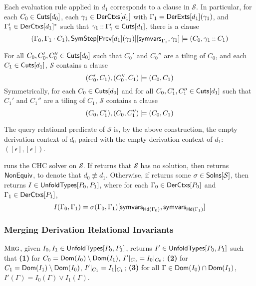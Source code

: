 Each evaluation rule applied in $d_1$ corresponds to a clause in
$\mathcal{S}$.
%
In particular, for each $C_0 \in \mathsf{Cuts}[  d_0  ]$, %
each $\gamma_1 \in \mathsf{DerCtxs}[  d_1  ]$ with $\Gamma_1 = \mathsf{DerExts}[ d_1 ](
\gamma_1 )$, and %
$\Gamma_1' \in \mathsf{DerCtxs}[  d_1  ]^{*}$ such that $\gamma_1 \mathbin{::}
\Gamma_1' \in \mathsf{Cuts}[  d_1  ]$, there is a clause
\[ ( \Gamma_0, \Gamma_1 \concat C_1), %
\symstep{ \prevrule{ d_1 }( \gamma_1 ) }[ %
\symvars{ \Gamma_1 }, \gamma_1 ] \entails %
(C_0, \gamma_1 \cons C_1) 
\]

For all $C_0, C_0', C_0'' \in \mathsf{Cuts}[ d_0 ]$ such that $C_0'$ and $C_0''$
are a tiling of $C_0$, and %
each $C_1 \in \mathsf{Cuts}[ d_1 ]$, $\mathcal{S}$ contains a clause
\[ (C_0', C_1), (C_0'', C_1) \models (C_0, C_1) \]
%
Symmetrically, for each $C_0 \in \mathsf{Cuts}[ d_0 ]$ and %
for all $C_0, C_1', C_1'' \in \mathsf{Cuts}[ d_1 ]$ such that $C_1'$ and $C_1''$
are a tiling of $C_1$, %
$\mathcal{S}$ contains a clause
\[ (C_0, C_1'), (C_0, C_1'') \models (C_0, C_1)
\]

The query relational predicate of $\mathcal{S}$ is, by the above
construction, the empty derivation context of $d_0$ paired with the
empty derivation context of $d_1$: $( [ \epsilon ], [ \epsilon ])$.

\verifyunfoldings runs the CHC solver \solvechc on $\mathcal{S}$.
%
If \solvechc returns that $\mathcal{S}$ has no solution, then
\verifyunfoldings returns $\mathsf{NonEquiv}$, to denote that $d_0 \not\equiv d_1$.
%
Otherwise, if \solvechc returns some $\sigma \in \mathsf{Solns}[ 
  \mathcal{S}  ]$, then \verifyunfoldings returns $I \in
\mathsf{UnfoldTypes}[ P_0, P_1 ]$, where for each $\Gamma_0 \in \mathsf{DerCtxs}[  P_0
 ]$ and $\Gamma_1 \in \mathsf{DerCtxs}[  P_1  ]$,
\[ I(\Gamma_0, \Gamma_1) = %
\subs{ \sigma(\Gamma_0, \Gamma_1) }{ %
  \symvars{ \headexps( \Gamma_0 ) }, %
  \symvars{ \headexps( \Gamma_1 ) } } \]

\subsubsection{Merging Derivation Relational Invariants}
\label{sec:merge}
$\textsc{Mrg}$, given $I_0, I_1 \in \mathsf{UnfoldTypes}[ P_0, P_1 ]$, returns $I'
\in \mathsf{UnfoldTypes}[ P_0, P_1 ]$ such that
\textbf{(1)} for $C_0 = \mathsf{Dom}(I_0) \setminus \mathsf{Dom}(I_1)$,
$I'|_{C_0} = I_0|_{C_0}$; 
\textbf{(2)} for $C_1 = \mathsf{Dom}(I_1) \setminus \mathsf{Dom}(I_0)$,
$I'|_{C_1} = I_1|_{C_1}$;
\textbf{(3)} for all $\Gamma \in \mathsf{Dom}(I_0) \cap
\mathsf{Dom}(I_1)$, $I'(\Gamma) = I_0(\Gamma) \lor I_1(\Gamma)$.

